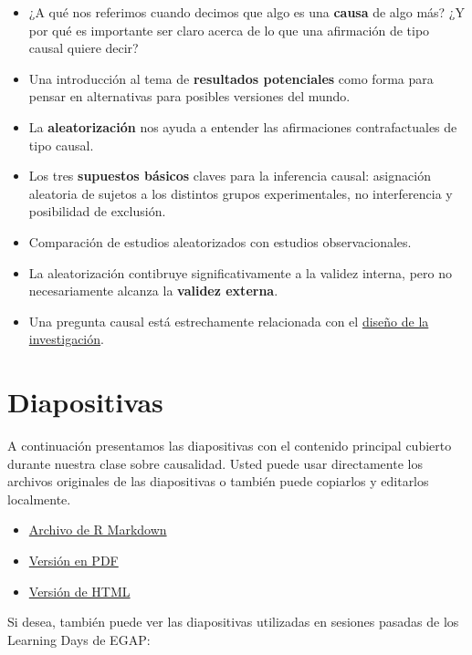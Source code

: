 \documentclass[12pt,spanish,]{book}
\begin{document}
\begin{itemize}
\item
  ¿A qué nos referimos cuando decimos que algo es una \textbf{causa} de algo más? ¿Y por qué es importante ser claro acerca de lo que una afirmación de tipo causal quiere decir?
\item
  Una introducción al tema de \textbf{resultados potenciales} como forma para pensar en alternativas para posibles versiones del mundo.
\item
  La \textbf{aleatorización} nos ayuda a entender las afirmaciones contrafactuales de tipo causal.
\item
  Los tres \textbf{supuestos básicos} claves para la inferencia causal: asignación aleatoria de sujetos a los distintos grupos experimentales, no interferencia y posibilidad de exclusión.
\item
  Comparación de estudios aleatorizados con estudios observacionales.
\item
  La aleatorización contibruye significativamente a la validez interna, pero no necesariamente alcanza la \textbf{validez externa}.
\item
  Una pregunta causal está estrechamente relacionada con el \href{the-research-design-process.html}{diseño de la investigación}.
\end{itemize}

\hypertarget{diapositivas-1}{%
\section{Diapositivas}\label{diapositivas-1}}

A continuación presentamos las diapositivas con el contenido principal cubierto durante nuestra clase sobre causalidad. Usted puede usar directamente los archivos originales de las diapositivas o también puede copiarlos y editarlos localmente.

\begin{itemize}
\item
  \href{https://egap.github.io/learningdays-resources/Slides_esp/causalinference-slides.Rmd}{Archivo de R Markdown}
\item
  \href{https://egap.github.io/learningdays-resources/Slides_esp/causalinference-slides.pdf}{Versión en PDF}
\item
  \href{https://egap.github.io/learningdays-resources/Slides_esp/causalinference-slides.html}{Versión de HTML}
\end{itemize}

Si desea, también puede ver las diapositivas utilizadas en sesiones pasadas de los Learning Days de EGAP:
\end{document}

